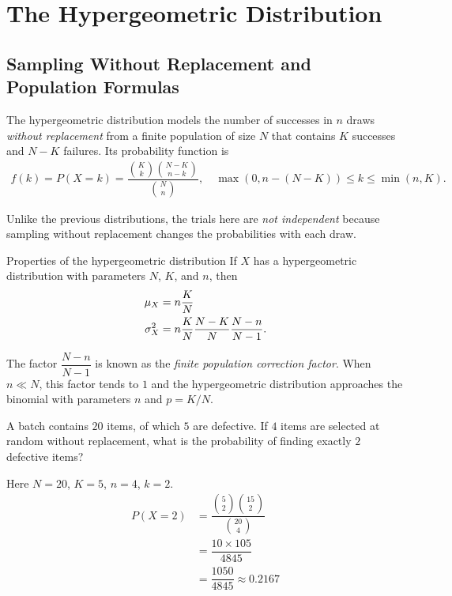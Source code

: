 \section{The Hypergeometric Distribution}
\subsection{Sampling Without Replacement and Population Formulas}

The hypergeometric distribution models the number of successes in $n$ draws \emph{without replacement} from a finite population of size $N$ that contains $K$ successes and $N-K$ failures. Its probability function is
\begin{align}
 \label{eq:2.10.11}
 f(k) = P(X=k) = \dfrac{\binom{K}{k}\binom{N-K}{n-k}}{\binom{N}{n}}, \quad \max(0, n-(N-K)) \leq k \leq \min(n, K).
\end{align}

Unlike the previous distributions, the trials here are \emph{not independent} because sampling without replacement changes the probabilities with each draw.

{Properties of the hypergeometric distribution} If $X$ has a hypergeometric distribution with parameters $N$, $K$, and $n$, then
\begin{align}
 \mu_{X} &= n\dfrac{K}{N} \\
 \sigma_{X}^{2} &= n\dfrac{K}{N}\dfrac{N-K}{N}\dfrac{N-n}{N-1}.
\end{align}

The factor $\dfrac{N-n}{N-1}$ is known as the \emph{finite population correction factor}. When $n \ll N$, this factor tends to $1$ and the hypergeometric distribution approaches the binomial with parameters $n$ and $p=K/N$.

\begin{ejemplo}
 \label{exmp:2.10.16}
 A batch contains $20$ items, of which $5$ are defective. If $4$ items are selected at random without replacement, what is the probability of finding exactly $2$ defective items?
\end{ejemplo}

\begin{solucion}
	Here $N=20$, $K=5$, $n=4$, $k=2$.
	\begin{align}
		P(X=2) &= \dfrac{\binom{5}{2}\binom{15}{2}}{\binom{20}{4}} \\
		&= \dfrac{10 \times 105}{4845} \\
		&= \dfrac{1050}{4845} \approx 0.2167
	\end{align}
\end{solucion}

